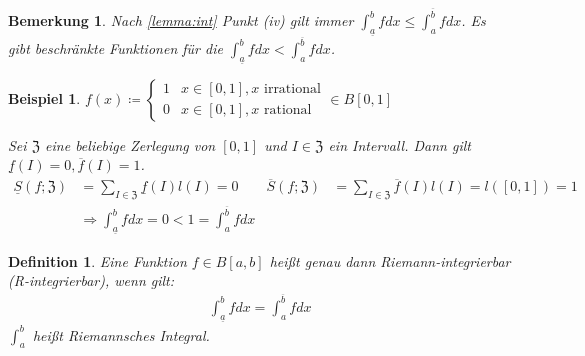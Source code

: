\documentclass[ngerman,titlepage,twoside, parskip=half*]{scrreprt}
\newcommand*{\ZZ}{\mathfrak{Z}}
\theoremstyle{break}
\newtheorem{definition}{Definition}[chapter]
\theoremstyle{nonumberbreak}
\newtheorem{remark}{Bemerkung}
\newtheorem{beispiel}{Beispiel}
\begin{document}
\begin{remark}
  Nach \autoref{lemma:int} Punkt (iv) gilt immer
  $\int_{\underline{a}}^b fdx\leq \int_a^{\overline{b}}fdx$. Es gibt
  beschränkte Funktionen für die $\int_{\underline{a}}^b fdx<
  \int_a^{\overline{b}}fdx$.
\end{remark}

\begin{beispiel}
$f(x)\coloneqq
\begin{cases}
  1 & x\in [0,1], x \text{ irrational}\\
  0 & x\in [0,1], x \text{ rational}
\end{cases} \in B[0,1]$

Sei $\ZZ$ eine beliebige Zerlegung von $[0,1]$ und $I\in \ZZ$ ein Intervall.
Dann gilt $\underline{f}(I)=0, \overline{f}(I)=1$.
\begin{align*}
  \underline{S}(f;\ZZ)&= \sum_{I\in\ZZ} \underline{f}(I)l(I)=0&
  \overline{S}(f;\ZZ)&= \sum_{I\in\ZZ} \overline{f}(I)l(I)=l([0,1])=1\\
  &\Rightarrow \int_{\underline{a}}^b fdx =0 < 1= \int_a^{\overline{b}} fdx
\end{align*}
\end{beispiel}

\begin{definition}
  Eine Funktion $f\in B[a,b]$ heißt genau dann Riemann-integrierbar
  (R-integrierbar), wenn gilt:
  \begin{gather*}\int_{\underline{a}}^b fdx = \int_a^{\overline{b}} fdx\end{gather*}
  $\int_a^b$ heißt \emph{Riemannsches Integral}.
\end{definition}
\end{document}
